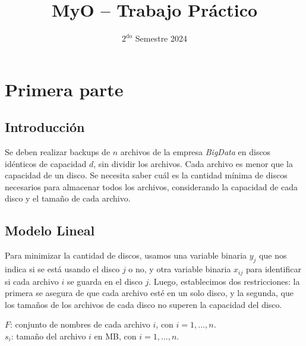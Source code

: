 \documentclass[11pt, a4paper, pdftex]{article}
\title{
	\huge MyO -- Trabajo Práctico\\
}
\author{
	\Mati \and \Xime \and \Lucifer \and \Lu
}
\date{\small $\text{2}^{\text{do}}$ Semestre 2024
}
\begin{document}
\renewcommand{\contentsname}{Contenidos}
\renewcommand{\listfigurename}{Listado de Figuras}
\renewcommand{\listtablename}{Listado de Tablas}
\renewcommand{\tablename}{Tabla}

\newcommand{\minimize}{\texttt{Minimize}\quad\,\,}
\newcommand{\maximize}{\texttt{Maximize}\quad\,\,}
\newcommand{\subjto}{\texttt{Subject to}\quad}

\maketitle

\tableofcontents

\newpage
\section{Primera parte}

\subsection{Introducción}

Se deben realizar backups de $n$ archivos de la empresa \emph{BigData}
en discos idénticos de capacidad $d$, sin dividir los archivos. Cada
archivo es menor que la capacidad de un disco. Se necesita saber cuál es
la cantidad mínima de discos necesarios para almacenar todos los
archivos, considerando la capacidad de cada disco y el tamaño de cada
archivo. 

\subsection{Modelo Lineal}\label{modelo:primera:parte}

Para minimizar la cantidad de discos, usamos una variable binaria
$y_{j}$ que nos indica si se está usando el disco $j$ o no, y otra
variable binaria $x_{ij}$ para identificar si cada archivo $i$ se guarda
en el disco $j$. Luego, establecimos dos restricciones: la primera se
asegura de que cada archivo esté en un solo disco, y la segunda, que los
tamaños de los archivos de cada disco no superen la capacidad del disco.

$F$: conjunto de nombres de cada archivo $i$, con $i = 1, \ldots, n$. \\

$s_{i}$: tamaño del archivo $i$ en MB, con $i = 1, \ldots, n$. \\
\end{document}
